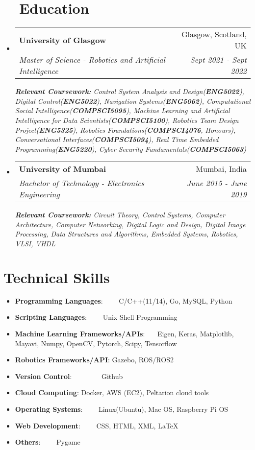 \documentclass[a4paper,20pt]{article}
\makeatletter
\newcommand{\resumeItem}[2]{
  \item\small{
    \textbf{#1}{: #2 \vspace{-2pt}}
  }
}
\newcommand{\resumeSubheading}[4]{
  \vspace{-1pt}\item
    \begin{tabular*}{0.97\textwidth}{l@{\extracolsep{\fill}}r}
      \textbf{#1} & #2 \\
      \textit{#3} & \textit{#4} \\
    \end{tabular*}\vspace{-5pt}
}
\newcommand{\resumeSubItem}[2]{\resumeItem{#1}{#2}\vspace{-3pt}}
\newcommand{\resumeSubHeadingListStart}{\begin{itemize}[leftmargin=*]}
\newcommand{\resumeSubHeadingListEnd}{\end{itemize}}
\makeatother
\begin{document}
\section{~~Education}
  \resumeSubHeadingListStart
    \resumeSubheading
      {University of Glasgow}{Glasgow, Scotland, UK}
      {Master of Science - Robotics and Artificial Intelligence}{Sept 2021 - Sept 2022}
      {\scriptsize \textit{ {\newline{}\textbf{Relevant Coursework:} Control System Analysis and Design(\textbf{ENG5022}), Digital Control(\textbf{ENG5022}), Navigation Systems(\textbf{ENG5062}), Computational Social Intelligence(\textbf{COMPSCI5095}), Machine Learning and Artificial Intelligence for Data Scientists(\textbf{COMPSCI5100}), Robotics Team Design Project(\textbf{ENG5325}), Robotics Foundations(\textbf{COMPSCI4076}, Honours), Conversational Interfaces(\textbf{COMPSCI5094}), Real Time Embedded Programming(\textbf{ENG5220}), Cyber Security Fundamentals(\textbf{COMPSCI5063})}}}
    \resumeSubHeadingListEnd
  \resumeSubHeadingListStart
    \resumeSubheading
      {University of Mumbai}{Mumbai, India}
      {Bachelor of Technology - Electronics Engineering}{June 2015 - June 2019}
      {\scriptsize \textit{ {\newline{}\textbf{Relevant Coursework:} Circuit Theory, Control Systems, Computer Architecture, Computer Networking, Digital Logic and Design, Digital Image Processing, Data Structures and Algorithms, Embedded Systems, Robotics, VLSI, VHDL}}}
    \resumeSubHeadingListEnd
\vspace{2pt}

\section{Technical Skills}
	\resumeSubHeadingListStart
	\resumeSubItem{Programming Languages}{~~~~C/C++(11/14), Go, MySQL, Python}
	\resumeSubItem{Scripting Languages}{~~~~Unix Shell Programming}
	\resumeSubItem{Machine Learning Frameworks/APIs}{~~~Eigen, Keras, Matplotlib, Mayavi, Numpy, OpenCV, Pytorch, Scipy, Tensorflow}
	\resumeSubItem{Robotics Frameworks/API}{Gazebo, ROS/ROS2}
	\resumeSubItem{Version Control}{~~~~~~~~Github}
	\resumeSubItem{Cloud Computing}{Docker, AWS (EC2), Peltarion cloud tools}
	\resumeSubItem{Operating Systems}{~~~~Linux(Ubuntu), Mac OS, Raspberry Pi OS}
	\resumeSubItem{Web Development}{~~~~CSS, HTML, XML, \LaTeX}
	\resumeSubItem{Others}{~~~~Pygame}
    \resumeSubHeadingListEnd
\vspace{2pt}
\end{document}
